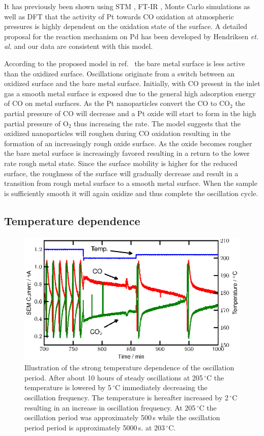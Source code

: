\documentclass[journal=jacsat,manuscript=article]{achemso}
\begin{document}
It has previously been shown using STM \cite{Hendriksen2002}, FT-IR
\cite{Carlsson2006}, Monte Carlo simulations \cite{Zhdanov2002} as well as DFT
\cite{Gong2004} that the activity of Pt towards CO oxidation at atmospheric
pressures is highly dependent on the oxidation state of the surface. A detailed
proposal for the reaction mechanism on Pd has been developed by Hendriksen
\textit{et. al.}\cite{Hendriksen2010} and our data are consistent with this
model.

According to the proposed model in ref.~ the bare metal
surface is less active than the oxidized surface. Oscillations originate from a
switch between an oxidized surface and the bare metal surface. Initially, with
CO present in the inlet gas a smooth metal surface is exposed due to the
general high adsorption energy of CO on metal surfaces. As the Pt nanoparticles
convert the CO to CO$_2$ the partial pressure of CO will decrease and a Pt
oxide will start to form in the high partial pressure of O$_2$ thus increasing
the rate. The model suggests that the oxidized
nanoparticles will roughen during CO oxidation resulting in the formation of an
increasingly rough oxide surface. As the oxide becomes rougher the bare metal
surface is increasingly favored resulting in a return to the lower rate rough
metal state. Since the surface mobility is higher for the reduced surface\cite{Hendriksen2010},
the roughness of the surface will gradually decrease and result
in a transition from rough metal surface to a smooth metal surface.
When the sample is sufficiently smooth it will again oxidize and thus complete
the oscillation cycle.

\subsection{Temperature dependence}
\begin{figure}
\includegraphics[width=12cm]{temperature_dependence.eps}
\caption{Illustration of the strong temperature dependence of the oscillation period. After about 10
  hours of steady oscillations at 205\,$^\circ$C the temperature is lowered by
  5\,$^\circ$C immediately decreasing the oscillation frequency. The temperature
  is hereafter increased by 2\,$^\circ$C resulting in an increase in oscillation
  frequency. At 205\,$^\circ$C the oscillation period was approximately 500\,s
  while the oscillation period period is approximately 5000\,s. at
  203\,$^\circ$C.
  \label{fgr:temperature_dependence}
}
\end{figure}
\end{document}

